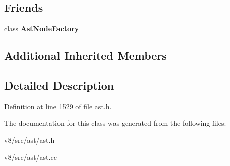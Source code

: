 \subsection*{Friends}
\begin{DoxyCompactItemize}
\item 
\mbox{\label{classv8_1_1internal_1_1ArrayLiteral_a8d587c8ad3515ff6433eb83c578e795f}} 
class {\bfseries Ast\+Node\+Factory}
\end{DoxyCompactItemize}
\subsection*{Additional Inherited Members}


\subsection{Detailed Description}


Definition at line 1529 of file ast.\+h.



The documentation for this class was generated from the following files\+:\begin{DoxyCompactItemize}
\item 
v8/src/ast/ast.\+h\item 
v8/src/ast/ast.\+cc\end{DoxyCompactItemize}
